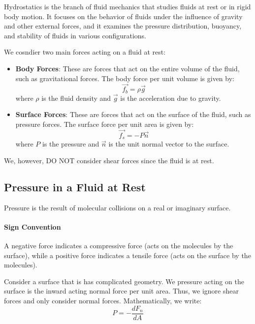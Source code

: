 \documentclass[11pt]{report}
\begin{document}
\begin{definition}[Hydrostatic]
    Hydrostatics is the branch of fluid mechanics that studies fluids at rest or in rigid body motion. It focuses on the behavior of fluids under the influence of gravity and other external forces, and it examines the pressure distribution, buoyancy, and stability of fluids in various configurations.

    We cosndier two main forces acting on a fluid at rest:
    \begin{itemize}
        \item \textbf{Body Forces}: These are forces that act on the entire volume of the fluid, such as gravitational forces. The body force per unit volume is given by:
        \[\vec{f_b} = \rho \vec{g}\]
        where \(\rho\) is the fluid density and \(\vec{g}\) is the acceleration due to gravity.
        \item \textbf{Surface Forces}: These are forces that act on the surface of the fluid, such as pressure forces. The surface force per unit area is given by:
        \[\vec{f_s} = -P \vec{n}\]
        where \(P\) is the pressure and \(\vec{n}\) is the unit normal vector to the surface.
    \end{itemize}
    We, however, DO NOT consider shear forces since the fluid is at rest.
\end{definition}

\subsection{Pressure in a Fluid at Rest}
\begin{definition}[Pressure]
    Pressure is the result of molecular collisions on a real or imaginary surface.
\end{definition}

\paragraph{Sign Convention} A negative force indicates a compressive force (acts on the molecules by the surface), while a positive force indicates a tensile force (acts on the surface by the molecules).

\begin{theorem}
    Consider a surface that is has complicated geometry. We pressure acting on the surface is the inward acting normal force per unit area. Thus, we ignore shear forces and only consider normal forces. Mathematically, we write:
    \begin{equation}
        P = -\frac{dF_n}{dA}
    \end{equation}
\end{theorem}
\end{document}
